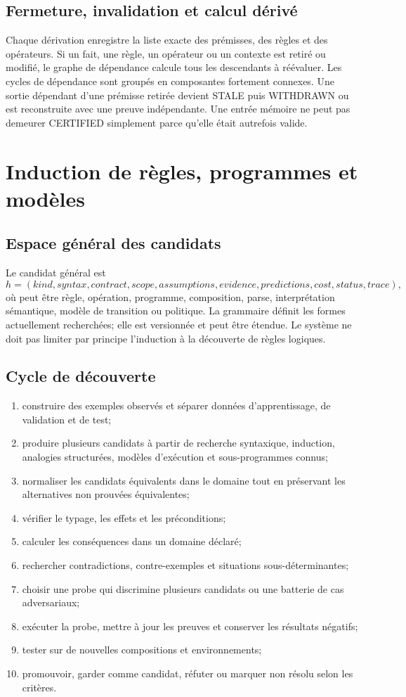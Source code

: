 \documentclass[11pt,a4paper]{article}
\newcommand{\code}[1]{\path{#1}}
\newcommand{\State}[1]{\textsf{#1}}
\begin{document}
\subsection{Fermeture, invalidation et calcul dérivé}
Chaque dérivation enregistre la liste exacte des prémisses, des règles et des opérateurs. Si un fait, une règle, un opérateur ou un contexte est retiré ou modifié, le graphe de dépendance calcule tous les descendants à réévaluer. Les cycles de dépendance sont groupés en composantes fortement connexes. Une sortie dépendant d'une prémisse retirée devient \State{STALE} puis \State{WITHDRAWN} ou est reconstruite avec une preuve indépendante. Une entrée mémoire ne peut pas demeurer \State{CERTIFIED} simplement parce qu'elle était autrefois valide.

\section{Induction de règles, programmes et modèles}
\subsection{Espace général des candidats}
Le candidat général est
\[
h=(kind,syntax,contract,scope,assumptions,evidence,predictions,cost,status,trace),
\]
où \code{kind} peut être règle, opération, programme, composition, parse, interprétation sémantique, modèle de transition ou politique. La grammaire définit les formes actuellement recherchées; elle est versionnée et peut être étendue. Le système ne doit pas limiter par principe l'induction à la découverte de règles logiques.

\subsection{Cycle de découverte}
\begin{enumerate}
\item construire des exemples observés et séparer données d'apprentissage, de validation et de test;
\item produire plusieurs candidats à partir de recherche syntaxique, induction, analogies structurées, modèles d'exécution et sous-programmes connus;
\item normaliser les candidats équivalents dans le domaine tout en préservant les alternatives non prouvées équivalentes;
\item vérifier le typage, les effets et les préconditions;
\item calculer les conséquences dans un domaine déclaré;
\item rechercher contradictions, contre-exemples et situations sous-déterminantes;
\item choisir une probe qui discrimine plusieurs candidats ou une batterie de cas adversariaux;
\item exécuter la probe, mettre à jour les preuves et conserver les résultats négatifs;
\item tester sur de nouvelles compositions et environnements;
\item promouvoir, garder comme candidat, réfuter ou marquer non résolu selon les critères.
\end{enumerate}
\end{document}
